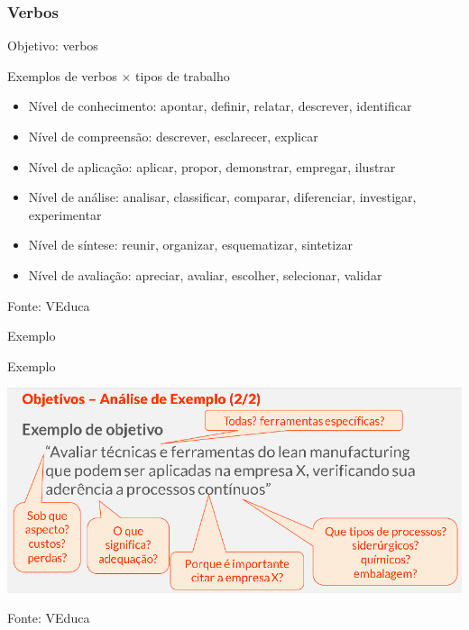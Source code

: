 \documentclass{beamer}
\begin{document}
\subsubsection{Verbos}

\begin{frame}{Objetivo: verbos}
  \begin{exampleblock}{Exemplos de verbos $\times$ tipos de trabalho}
  \begin{itemize}
    \scriptsize
\item Nível de conhecimento: apontar, definir, relatar, descrever,
    identificar
  \item Nível de compreensão: descrever, esclarecer, explicar
  \item Nível de aplicação: aplicar, propor, demonstrar, empregar, ilustrar
  \item Nível de análise: analisar, classificar, comparar,
    diferenciar, investigar, experimentar
  \item Nível de síntese: reunir, organizar, esquematizar, sintetizar
  \item Nível de avaliação: apreciar, avaliar, escolher, selecionar, validar
  \end{itemize}
\end{exampleblock}
  \vfill
  \scriptsize
  Fonte: VEduca
\end{frame}


\begin{frame}{Exemplo}
  \begin{exampleblock}{Exemplo}
    \begin{center}
      \includegraphics[width=\textwidth]{EstruturaI/objetivo-verbos}
    \end{center}
  \end{exampleblock}

  \vfill
  \scriptsize
  Fonte: VEduca
\end{frame}
\end{document}
